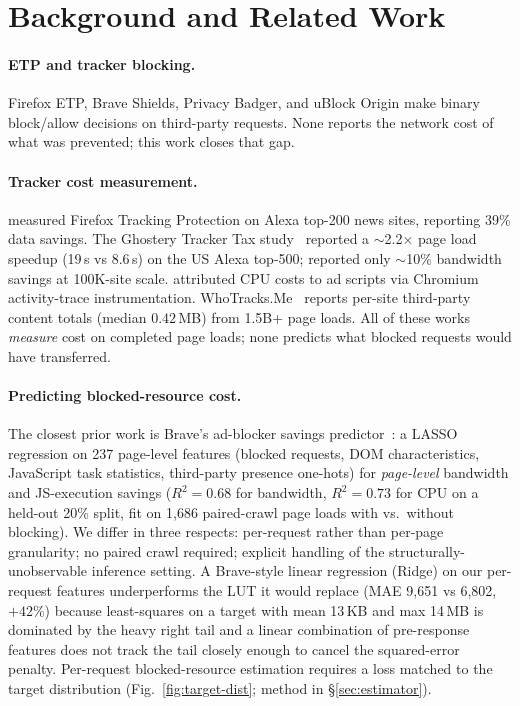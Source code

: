 \documentclass[10pt,sigconf,letterpaper,anonymous]{acmart}
\begin{document}
\section{Background and Related Work}
\label{sec:related}

\paragraph{ETP and tracker blocking.}
Firefox ETP, Brave Shields, Privacy Badger, and uBlock Origin make binary block/allow decisions on third-party requests.
None reports the network cost of what was prevented; this work closes that gap.

\paragraph{Tracker cost measurement.}
\citet{kontaxis2015tracking} measured Firefox Tracking Protection on Alexa top-200 news sites, reporting 39\% data savings.
The Ghostery Tracker Tax study~\cite{ghostery2020tracker} reported a $\sim$2.2$\times$ page load speedup (19\,s vs 8.6\,s) on the US Alexa top-500; \citet{castelluroz2020demystifying} reported only $\sim$10\% bandwidth savings at 100K-site scale.
\citet{pourghassemi2021adperf} attributed CPU costs to ad scripts via Chromium activity-trace instrumentation.
WhoTracks.Me~\cite{karaj2018whotracksme} reports per-site third-party content totals (median $0.42$\,MB) from 1.5B+ page loads.
All of these works \emph{measure} cost on completed page loads; none predicts what blocked requests would have transferred.

\paragraph{Predicting blocked-resource cost.}
The closest prior work is Brave's ad-blocker savings predictor~\cite{brave2019savings}: a LASSO regression on 237 page-level features (blocked requests, DOM characteristics, JavaScript task statistics, third-party presence one-hots) for \emph{page-level} bandwidth and JS-execution savings ($R^2=0.68$ for bandwidth, $R^2=0.73$ for CPU on a held-out 20\% split, fit on 1{,}686 paired-crawl page loads with vs.\ without blocking).
We differ in three respects: per-request rather than per-page granularity; no paired crawl required; explicit handling of the structurally-unobservable inference setting.
A Brave-style linear regression (Ridge) on our per-request features underperforms the LUT it would replace (MAE 9{,}651 vs 6{,}802, $+42$\%) because least-squares on a target with mean 13\,KB and max 14\,MB is dominated by the heavy right tail and a linear combination of pre-response features does not track the tail closely enough to cancel the squared-error penalty. Per-request blocked-resource estimation requires a loss matched to the target distribution (Fig.~\ref{fig:target-dist}; method in \S\ref{sec:estimator}).
\end{document}
